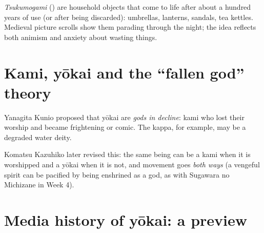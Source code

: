 \begin{definition}[Tsukumogami]
\emph{Tsukumogami} () are household objects that come to life after about a
hundred years of use (or after being discarded): umbrellas, lanterns, sandals, tea
kettles. Medieval picture scrolls show them parading through the night; the idea reflects
both animism and anxiety about wasting things.
\end{definition}

\section{Kami, yōkai and the ``fallen god'' theory}

Yanagita Kunio proposed that yōkai are \emph{gods in decline}: kami who lost their worship
and became frightening or comic. The kappa, for example, may be a degraded water deity.

\begin{center}
\end{center}

Komatsu Kazuhiko later revised this: the same being can be a kami when it is worshipped
and a yōkai when it is not, and movement goes \emph{both ways} (a vengeful spirit can be
pacified by being enshrined as a god, as with Sugawara no Michizane in Week 4).

\section{Media history of yōkai: a preview}

\begin{center}
\end{center}

